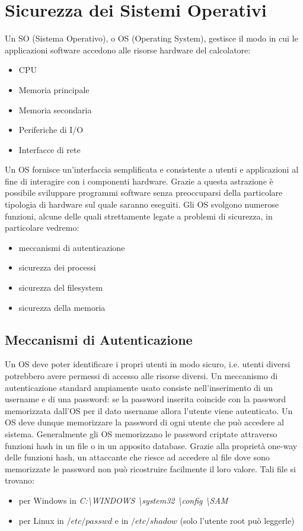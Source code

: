 \chapter{Sicurezza dei Sistemi Operativi}
Un SO (Sistema Operativo), o OS (Operating System), gestisce il modo in cui le applicazioni software accedono alle risorse hardware del calcolatore:
\begin{itemize} 
  \item CPU
  \item Memoria principale
  \item Memoria secondaria
  \item Periferiche di I/O
  \item Interfacce di rete
\end{itemize}
Un OS fornisce un'interfaccia semplificata e consistente a utenti e applicazioni al fine di interagire con i componenti hardware. Grazie a questa astrazione è possibile sviluppare programmi software senza preoccuparsi della particolare tipologia di hardware sul quale saranno eseguiti. Gli OS svolgono numerose funzioni, alcune delle quali strettamente legate a problemi di sicurezza, in particolare vedremo:
\begin{itemize} 
  \item meccanismi di autenticazione
  \item sicurezza dei processi
  \item sicurezza del filesystem
  \item sicurezza della memoria
\end{itemize}
\section{Meccanismi di Autenticazione}
Un OS deve poter identificare i propri utenti in modo sicuro, i.e. utenti diversi potrebbero avere permessi di accesso alle risorse diversi. Un meccanismo di autenticazione standard ampiamente usato consiste nell'inserimento di un username e di una password: se la password inserita coincide con la password memorizzata dall'OS per il dato username allora l'utente viene autenticato. Un OS deve dunque memorizzare la password di ogni utente che può accedere al sistema. Generalmente gli OS memorizzano le password criptate attraverso funzioni hash in un file o in un apposito database. Grazie alla proprietà one-way delle funzioni hash, un attaccante che riesce ad accedere al file dove sono memorizzate le password non può ricostruire facilmente il loro valore. Tali file si trovano:
\begin{itemize} 
	  \item per Windows in \textit{C:\textbackslash WINDOWS \textbackslash system32 \textbackslash config \textbackslash SAM}
  \item per Linux in $/etc/passwd$ e in $/etc/shadow$ (solo l'utente root può leggerle)
\end{itemize}

